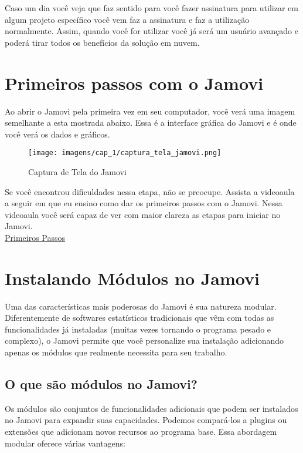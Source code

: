Caso um dia você veja que faz sentido para você fazer assinatura para utilizar em algum projeto específico você vem faz a assinatura e faz a utilização normalmente. Assim, quando você for utilizar você já será um usuário avançado e poderá tirar todos os benefícios da solução em nuvem.

\section{Primeiros passos com o Jamovi}

Ao abrir o Jamovi pela primeira vez em seu computador, você verá uma imagem semelhante a esta mostrada abaixo. Essa é a interface gráfica do Jamovi e é onde você verá os dados e gráficos.

\begin{figure}[H]
  \centering
  \caption{Captura de Tela do Jamovi}
  \texttt{[image: imagens/cap\_1/captura\_tela\_jamovi.png]}
  \label{fig:captura_tela_jamovi}
\end{figure}

\begin{tcolorbox}[colback=white,colframe=green,title={\faPlayCircle \ Dica de Conteúdo}]
  Se você encontrou dificuldades nessa etapa, não se preocupe. Assista a videoaula a seguir em que eu ensino como dar os primeiros passos com o Jamovi. Nessa videoaula você será capaz de ver com maior clareza as etapas para iniciar no Jamovi.\\
  \faYoutube{} \href{https://www.youtube.com/watch?v=bV9hlHPLe5I&t=5s}{Primeiros Passos}
\end{tcolorbox}

\section{Instalando Módulos no Jamovi}

Uma das características mais poderosas do Jamovi é sua natureza modular. Diferentemente de softwares estatísticos tradicionais que vêm com todas as funcionalidades já instaladas (muitas vezes tornando o programa pesado e complexo), o Jamovi permite que você personalize sua instalação adicionando apenas os módulos que realmente necessita para seu trabalho.

\subsection{O que são módulos no Jamovi?}

Os módulos são conjuntos de funcionalidades adicionais que podem ser instalados no Jamovi para expandir suas capacidades. Podemos compará-los a plugins ou extensões que adicionam novos recursos ao programa base. Essa abordagem modular oferece várias vantagens:

